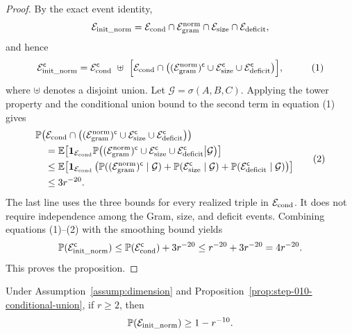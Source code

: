 \begin{proof}
By the exact event identity,
\[
  \mathcal E_{\rm init\_norm}
  =\mathcal E_{\rm cond}\cap\mathcal E_{\rm gram}^{\rm norm}
   \cap\mathcal E_{\rm size}\cap\mathcal E_{\rm deficit},
\]
and hence
\[
\begin{aligned}
  \mathcal E_{\rm init\_norm}^{\mathsf c}
  ={}&\mathcal E_{\rm cond}^{\mathsf c}\ \uplus\
  \Bigl[\mathcal E_{\rm cond}\cap
    \bigl((\mathcal E_{\rm gram}^{\rm norm})^{\mathsf c}
      \cup\mathcal E_{\rm size}^{\mathsf c}
      \cup\mathcal E_{\rm deficit}^{\mathsf c}\bigr)\Bigr],
\end{aligned}                                               \tag{1}
\]
where \(\uplus\) denotes a disjoint union. Let
\(\mathcal G=\sigma(A,B,C)\). Applying the tower property and the
conditional union bound to the second term in equation (1) gives
\[
\begin{aligned}
&\mathbb P\!\left(\mathcal E_{\rm cond}\cap
    \bigl((\mathcal E_{\rm gram}^{\rm norm})^{\mathsf c}
      \cup\mathcal E_{\rm size}^{\mathsf c}
      \cup\mathcal E_{\rm deficit}^{\mathsf c}\bigr)\right)\\
&\quad=\mathbb E\!\left[\mathbf 1_{\mathcal E_{\rm cond}}
  \mathbb P\!\left(
    (\mathcal E_{\rm gram}^{\rm norm})^{\mathsf c}
      \cup\mathcal E_{\rm size}^{\mathsf c}
      \cup\mathcal E_{\rm deficit}^{\mathsf c}
      \middle|\mathcal G\right)\right]\\
&\quad\le\mathbb E\!\left[\mathbf 1_{\mathcal E_{\rm cond}}
  \left(
    \mathbb P((\mathcal E_{\rm gram}^{\rm norm})^{\mathsf c}
      \mid\mathcal G)
    +\mathbb P(\mathcal E_{\rm size}^{\mathsf c}\mid\mathcal G)
    +\mathbb P(\mathcal E_{\rm deficit}^{\mathsf c}\mid\mathcal G)
  \right)\right]\\
&\quad\le 3r^{-20}.
\end{aligned}\tag{2}
\]
The last line uses the three bounds for every realized triple in
\(\mathcal E_{\rm cond}\). It does not require independence among the
Gram, size, and deficit events. Combining equations (1)--(2) with the
smoothing bound yields
\[
  \mathbb P(\mathcal E_{\rm init\_norm}^{\mathsf c})
  \le \mathbb P(\mathcal E_{\rm cond}^{\mathsf c})+3r^{-20}
  \le r^{-20}+3r^{-20}=4r^{-20}.
\]
This proves the proposition. 

\end{proof}


\begin{proposition}
\label{prop:step-010-public-confidence}
Under Assumption~\ref{assump:dimension} and
Proposition~\ref{prop:step-010-conditional-union}, if \(r\ge2\), then
\[
  \mathbb P(\mathcal E_{\rm init\_norm})\ge1-r^{-10}.
\]

\end{proposition}


